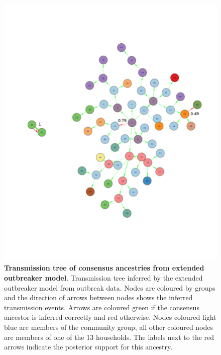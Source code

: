 \documentclass[11pt,a4paper]{report}
\begin{document}
\begin{figure}[h!]
\centering
\includegraphics[scale=0.4]{tree_with_grps.png} \newline
\caption{{\bf Transmission tree of consensus ancestries from extended outbreaker model}. Transmission tree inferred by the extended outbreaker model from outbreak data. Nodes are coloured by groups and the direction of arrows between nodes shows the inferred transmission events. Arrows are coloured green if the consensus ancestor is inferred correctly and red otherwise. Nodes coloured light blue are members of the community group, all other coloured nodes are members of one of the 13 households. The labels next to the red arrows indicate the posterior support for this ancestry.}
\end{figure}
\end{document}
